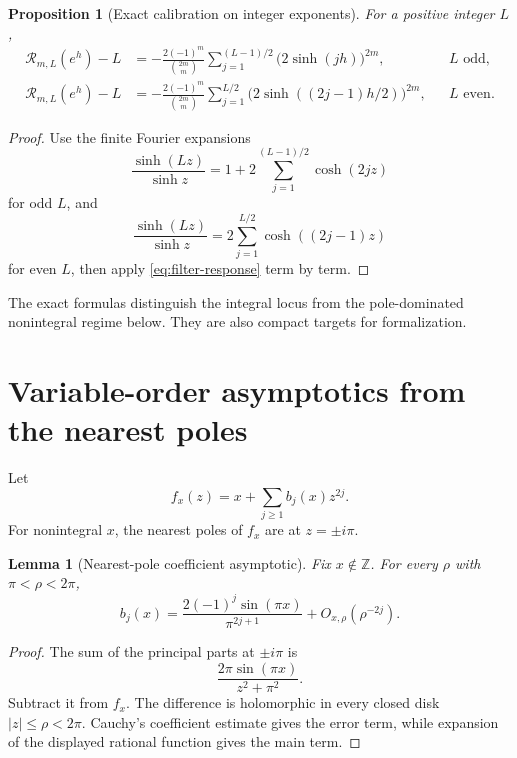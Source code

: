 \documentclass[11pt]{article}
\newtheorem{proposition}[theorem]{Proposition}
\newtheorem{lemma}[theorem]{Lemma}
\theoremstyle{definition}
\newcommand{\Z}{\mathbb Z}
\begin{document}
\begin{proposition}[Exact calibration on integer exponents]
\label{prop:integer-calibration}
For a positive integer $L$,
\begin{align}
 \mathcal R_{m,L}(e^h)-L
 &=-\frac{2(-1)^m}{\binom{2m}{m}}
 \sum_{j=1}^{(L-1)/2}\bigl(2\sinh(jh)\bigr)^{2m},
 &&L\text{ odd},
 \label{eq:integer-odd}\\
 \mathcal R_{m,L}(e^h)-L
 &=-\frac{2(-1)^m}{\binom{2m}{m}}
 \sum_{j=1}^{L/2}
 \bigl(2\sinh((2j-1)h/2)\bigr)^{2m},
 &&L\text{ even}.
 \label{eq:integer-even}
\end{align}
\end{proposition}

\begin{proof}
Use the finite Fourier expansions
\[
 \frac{\sinh(Lz)}{\sinh z}
 =1+2\sum_{j=1}^{(L-1)/2}\cosh(2jz)
\]
for odd $L$, and
\[
 \frac{\sinh(Lz)}{\sinh z}
 =2\sum_{j=1}^{L/2}\cosh((2j-1)z)
\]
for even $L$, then apply \eqref{eq:filter-response} term by term.
\end{proof}

The exact formulas distinguish the integral locus from the pole-dominated
nonintegral regime below.  They are also compact targets for formalization.

\section{Variable-order asymptotics from the nearest poles}
\label{sec:asymptotic}

Let
\begin{equation}
 f_x(z)=x+\sum_{j\ge1}b_j(x)z^{2j}.
\end{equation}
For nonintegral $x$, the nearest poles of $f_x$ are at $z=\pm i\pi$.

\begin{lemma}[Nearest-pole coefficient asymptotic]
\label{lem:coefficient-asymptotic}
Fix $x\notin\Z$.  For every $\rho$ with $\pi<\rho<2\pi$,
\begin{equation}
 b_j(x)=\frac{2(-1)^j\sin(\pi x)}{\pi^{2j+1}}
 +O_{x,\rho}(\rho^{-2j}).
 \label{eq:coefficient-asymptotic}
\end{equation}
\end{lemma}

\begin{proof}
The sum of the principal parts at $\pm i\pi$ is
\[
 \frac{2\pi\sin(\pi x)}{z^2+\pi^2}.
\]
Subtract it from $f_x$.  The difference is holomorphic in every closed disk
$|z|\le\rho<2\pi$.  Cauchy's coefficient estimate gives the error term,
while expansion of the displayed rational function gives the main term.
\end{proof}
\end{document}
